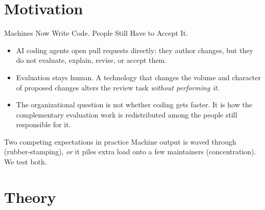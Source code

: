 %

\section{Motivation}

\begin{frame}{Machines Now Write Code. People Still Have to Accept It.}
\begin{itemize}
  \item AI coding agents open pull requests directly: they author changes,
        but they do not evaluate, explain, revise, or accept them.
  \item Evaluation stays human. A technology that changes the volume and
        character of proposed changes alters the review task
        \emph{without performing it}.
  \item The organizational question is not whether coding gets faster.
        It is how the complementary evaluation work is redistributed
        among the people still responsible for it.
\end{itemize}
\vfill
\begin{block}{Two competing expectations in practice}
  Machine output is waved through (rubber-stamping), \emph{or} it piles
  extra load onto a few maintainers (concentration). We test both.
\end{block}
\end{frame}

\section{Theory}


